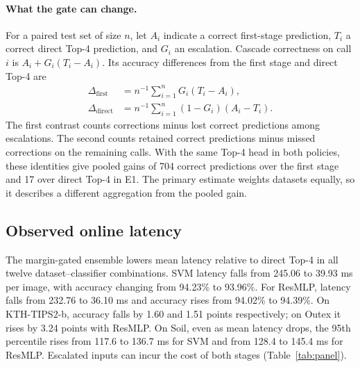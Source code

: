 \documentclass[10pt,a4paper,fleqn]{article}
\begin{document}
\paragraph{What the gate can change.}
For a paired test set of size $n$, let $A_i$ indicate a correct first-stage prediction, $T_i$ a correct direct Top-4 prediction, and $G_i$ an escalation. Cascade correctness on call $i$ is $A_i+G_i(T_i-A_i)$. Its accuracy differences from the first stage and direct Top-4 are
\begin{align}
 \Delta_{\mathrm{first}} &= n^{-1}\sum_{i=1}^{n}G_i(T_i-A_i),\\
 \Delta_{\mathrm{direct}} &= n^{-1}\sum_{i=1}^{n}(1-G_i)(A_i-T_i).
\end{align}
The first contrast counts corrections minus lost correct predictions among escalations. The second counts retained correct predictions minus missed corrections on the remaining calls. With the same Top-4 head in both policies, these identities give pooled gains of 704 correct predictions over the first stage and 17 over direct Top-4 in E1. The primary estimate weights datasets equally, so it describes a different aggregation from the pooled gain.

\subsection{Observed online latency}

The margin-gated ensemble lowers mean latency relative to direct Top-4 in all twelve dataset--classifier combinations. SVM latency falls from 245.06 to 39.93 ms per image, with accuracy changing from 94.23\% to 93.96\%. For ResMLP, latency falls from 232.76 to 36.10 ms and accuracy rises from 94.02\% to 94.39\%. On KTH-TIPS2-b, accuracy falls by 1.60 and 1.51 points respectively; on Outex it rises by 3.24 points with ResMLP. On Soil, even as mean latency drops, the 95th percentile rises from 117.6 to 136.7 ms for SVM and from 128.4 to 145.4 ms for ResMLP. Escalated inputs can incur the cost of both stages (Table~\ref{tab:panel}).
\end{document}
